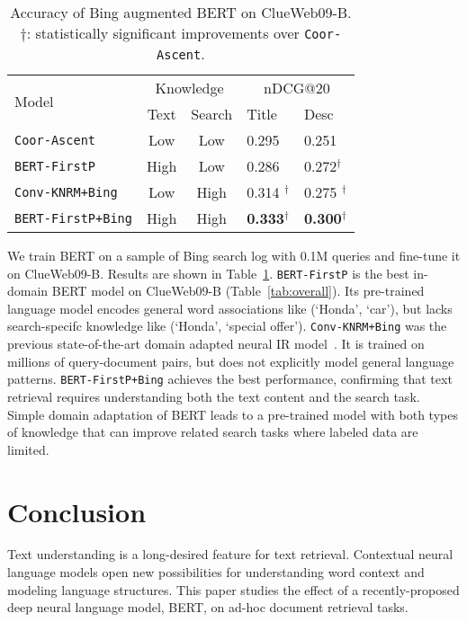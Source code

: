 \documentclass[sigconf]{acmart}
\begin{document}
\begin{table}[tb]
\caption{Accuracy of Bing augmented BERT on ClueWeb09-B. $\dagger$: statistically significant improvements over \texttt{Coor-Ascent}.}\label{tab:enhance}
\def\arraystretch{0.85}
\vspace{-0.15in}

\begin{tabular}{l|cc|ll}
\hline \hline
    \multirow{2}{*}{Model}  & \multicolumn{2}{c|}{Knowledge} & \multicolumn{2}{c}{nDCG@20} \\
              & Text &  Search         & {Title} & {Desc}\\ \hline
\texttt{Coor-Ascent}              & Low & Low   & 0.295     & 0.251    \\ \hline
\texttt{BERT-FirstP}  & High & Low & 0.286     & 0.272$^{\dagger}$    \\ 

\texttt{Conv-KNRM+Bing}    &  Low & High   & 0.314 $^{\dagger}$     &  0.275 $^{\dagger}$    \\ 
\texttt{BERT-FirstP+Bing}  & High  & High  & \textbf{0.333}$^{\dagger}$      & \textbf{0.300}$^{\dagger}$   \\ 
 \hline \hline

\end{tabular}
\end{table}



We train BERT on a sample of Bing search log with 0.1M queries and fine-tune it on ClueWeb09-B. Results are shown in Table~\ref{tab:enhance}. \texttt{BERT-FirstP} is the best in-domain BERT model on ClueWeb09-B (Table~\ref{tab:overall}). Its pre-trained language model encodes general word associations like (`Honda', `car'), but lacks search-specifc knowledge like  (`Honda', `special offer').
\texttt{Conv-KNRM+Bing} was the previous state-of-the-art domain adapted neural IR model~\cite{dai2018convolutional}.  It is trained on millions of query-document pairs, but does not explicitly model general language patterns. \texttt{BERT-FirstP+Bing}  achieves the best performance, confirming that text retrieval requires understanding both the text content and the search task. Simple domain adaptation of BERT leads to a pre-trained model with both types of knowledge that can improve related search tasks where labeled data are limited. %
 
 \section{Conclusion}
Text understanding is a long-desired feature for text retrieval.  Contextual neural language models open new possibilities for understanding word context and modeling language structures. This paper studies the effect of a recently-proposed deep neural language model, BERT, on ad-hoc document retrieval tasks.
\end{document}

